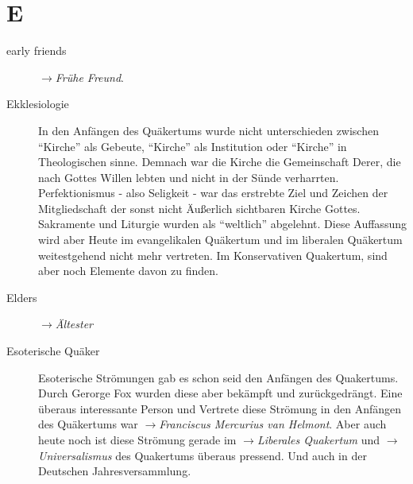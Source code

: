 \section*{E}

\articlesize

\begin{description}

 \item[early friends] $\to$\textit{Frühe Freund}.


 \item[Ekklesiologie] In den Anfängen des Quäkertums wurde nicht unterschieden zwischen "`Kirche"' als Gebeute, "`Kirche"' als Institution oder "`Kirche"' in Theologischen sinne. Demnach war die Kirche die Gemeinschaft Derer, die nach Gottes Willen lebten und nicht in der Sünde verharrten. Perfektionismus - also Seligkeit - war das erstrebte Ziel und Zeichen der Mitgliedschaft der sonst nicht Äußerlich sichtbaren Kirche Gottes. Sakramente und Liturgie wurden als "`weltlich"' abgelehnt. Diese Auffassung wird aber Heute im evangelikalen Quäkertum und im liberalen Quäkertum weitestgehend nicht mehr vertreten. Im Konservativen Quakertum, sind aber noch Elemente davon zu finden.


  \item[Elders] $\to$\textit{Ältester}

  \item[Esoterische Quäker] Esoterische Strömungen gab es schon seid den Anfängen
  des Quakertums. Durch Gerorge Fox wurden diese aber bekämpft und zurückgedrängt.
  Eine überaus interessante Person und Vertrete diese Strömung in den Anfängen
  des Quäkertums war $\to$\textit{Franciscus Mercurius van Helmont}. Aber auch
  heute noch ist diese Strömung gerade im $\to$\textit{Liberales Quakertum} und
  $\to$\textit{Universalismus} des Quakertums überaus pressend. Und auch in der
  Deutschen Jahresversammlung.


\end{description}
